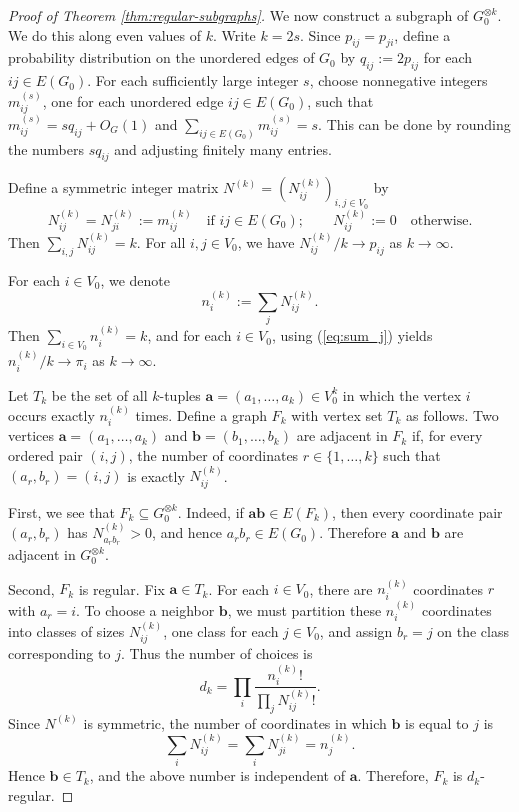 \documentclass[10pt,a4paper]{amsart}
\begin{document}
\begin{proof}[Proof of Theorem \ref{thm:regular-subgraphs}]
We now construct a subgraph of \(G_0^{\otimes k}\).  
We do this along even values of \(k\).  Write \(k=2s\).  Since
\(p_{ij}=p_{ji}\), define a probability distribution on the unordered edges of \(G_0\) by
        $q_{ij}:=2p_{ij}$ for each $ij\in E(G_0).$
For each sufficiently large integer \(s\), choose nonnegative integers
\(m_{ij}^{(s)}\), one for each unordered edge \(ij\in E(G_0)\), such that $m_{ij}^{(s)}=s q_{ij}+O_G(1)$ and 
        $\sum_{ij\in E(G_0)}m_{ij}^{(s)}=s$. This can be done by rounding the numbers \(s q_{ij}\) and adjusting
finitely many entries.

Define a symmetric integer matrix
\(N^{(k)}=(N_{ij}^{(k)})_{i,j\in V_0}\) by
\[ N_{ij}^{(k)}=N_{ji}^{(k)}:=m_{ij}^{(k)}
\quad\text{if }ij\in E(G_0);
\qquad
  N_{ij}^{(k)}:=0
\quad\text{otherwise}.
\]
Then $\sum_{i,j}N_{ij}^{(k)}=k$. 
For all \(i,j\in V_0\), we have ${N_{ij}^{(k)}}/{k}\to p_{ij}$ as $k\to\infty$.

For each \(i\in V_0\), we denote 
\[
        n_i^{(k)}:=\sum_j N_{ij}^{(k)}.
\]
Then $\sum_{i\in V_0} n_i^{(k)}=k$, and for each $i\in V_0$, using (\ref{eq:sum_j}) yields   
${n_i^{(k)}}/ {k}\to \pi_i$ as $k\to \infty$.

Let \(T_k\) be the set of all \(k\)-tuples $\bm a=(a_1,\dots,a_k)\in V_0^k$ in which the vertex \(i\) occurs exactly \(n_i^{(k)}\) times.  Define a
graph \(F_k\) with vertex set \(T_k\) as follows.  Two vertices
\(\bm a=(a_1,\dots,a_k)\) and \(\bm b=(b_1,\dots,b_k)\) are adjacent in
\(F_k\) if, for every ordered pair \((i,j)\), the number of coordinates
\(r\in\{1,\dots,k\}\) such that
$  (a_r,b_r)=(i,j)$ 
is exactly \(N_{ij}^{(k)}\).

First, we see that \(F_k\subseteq G_0^{\otimes k}\).  Indeed, if
\(\bm a\bm b\in E(F_k)\), then every coordinate pair \((a_r,b_r)\) has
\(N_{a_r b_r}^{(k)}>0\), and hence \(a_r b_r\in E(G_0)\).  Therefore
\(\bm a\) and \(\bm b\) are adjacent in \(G_0^{\otimes k}\).

Second, \(F_k\) is regular.  Fix \(\bm a\in T_k\).  For each \(i\in V_0\),
there are \(n_i^{(k)}\) coordinates \(r\) with \(a_r=i\).  To choose a
neighbor \(\bm b\), we must partition these \(n_i^{(k)}\) coordinates
into classes of sizes \(N_{ij}^{(k)}\), one class for each \(j\in V_0\),
and assign \(b_r=j\) on the class corresponding to \(j\).  Thus the
number of choices is
\[
        d_k
        =
        \prod_i
        \frac{n_i^{(k)}!}{\prod_j N_{ij}^{(k)}!}.
\]
Since \(N^{(k)}\) is symmetric, the number of coordinates in which
\(\bm b\) is equal to \(j\) is
\[
        \sum_i N_{ij}^{(k)}
        =
        \sum_i N_{ji}^{(k)}
        =
        n_j^{(k)}.
\]
Hence \(\bm b\in T_k\), and the above number is independent of
\(\bm a\).  Therefore, \(F_k\) is \(d_k\)-regular.


\end{proof}
\end{document}
